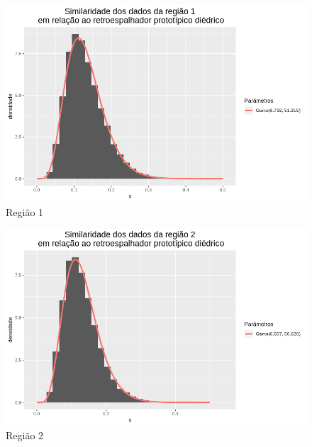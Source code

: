 \documentclass[12pt]{article}
\begin{document}
\begin{figure}[!h]
    \centering
    \vspace{0.1\linewidth}
    \includegraphics[width = 0.95\linewidth]{../../Images/Report_18_12_17/di_region1.png}
    \caption{Região 1}
    \label{fig:di_r1}
\end{figure}

\begin{figure}[!h]
    \centering
    \vspace{0.05\linewidth}
    \includegraphics[width = 0.95\linewidth]{../../Images/Report_18_12_17/di_region2.png}
    \caption{Região 2}
    \label{fig:di_r2}
\end{figure}
\end{document}
